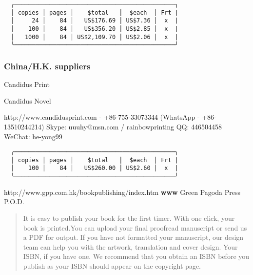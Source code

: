 \documentclass[
]{article}
\begin{document}
\begin{verbatim}
  ╭──────────────────────────────────────────────╮ 
  │ copies │ pages │    $total   │  $each  │ Frt | 
  │     24 │    84 │   US$176.69 │ US$7.36 │  x  | 
  │    100 │    84 │   US$356.20 │ US$2.85 │  x  | 
  │   1000 │    84 │ US$2,109.70 │ US$2.06 │  x  | 
  ╰──────────────────────────────────────────────╯ 
\end{verbatim}

\subsubsection{China/H.K. suppliers}

Candidus Print

Candidus Novel

http://www.candidusprint.com - +86-755-33073344 (WhatsApp -
+86-13510244214) Skype: uuuhy@msn.com / rainbowprinting QQ: 446504458
WeChat: he-yong99

\begin{verbatim}
  ╭──────────────────────────────────────────────╮ 
  │ copies │ pages │    $total   │  $each  │ Frt | 
  │    100 │    84 │   US$260.00 │ US$2.60 │  x  | 
  ╰──────────────────────────────────────────────╯ 
\end{verbatim}

http://www.gpp.com.hk/bookpublishing/index.htm \textbf{www} Green Pagoda
Press P.O.D.

\begin{quote}
It is easy to publish your book for the first timer. With one click,
your book is printed.You can upload your final proofread manuscript or
send us a PDF for output. If you have not formatted your manuscript, our
design team can help you with the artwork, translation and cover design.
Your ISBN, if you have one. We recommend that you obtain an ISBN before
you publish as your ISBN should appear on the copyright page.
\end{quote}
\end{document}
